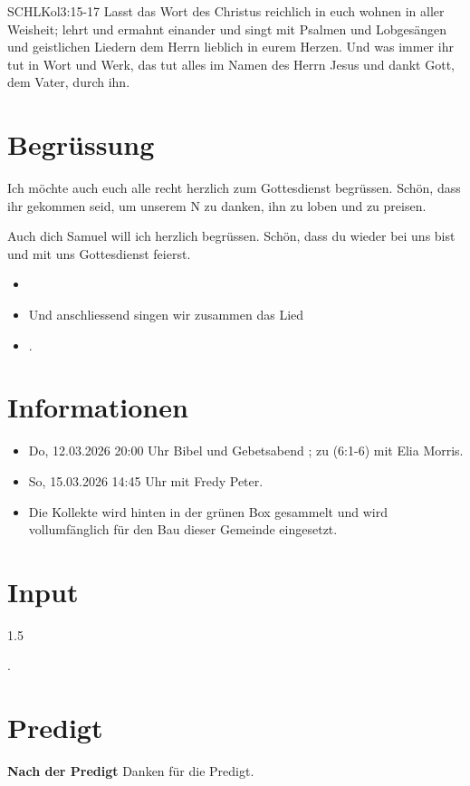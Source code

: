 \documentclass[fontsize=14pt]{mybib}
\newcommand{\Name}{Samuel}
\begin{document}
\begin{bibelbox}{SCHL}{Kol}{3:15-17}
    Lasst das Wort des Christus reichlich in euch wohnen in aller Weisheit; lehrt und ermahnt einander und singt mit Psalmen und Lobgesängen und geistlichen Liedern dem Herrn lieblich in eurem Herzen. Und was immer ihr tut in Wort und Werk, das tut alles im Namen des Herrn Jesus und dankt Gott, dem Vater, durch ihn.
\end{bibelbox}
\section{Begrüssung}
Ich möchte auch euch alle recht herzlich zum Gottesdienst begrüssen. Schön, dass ihr gekommen seid, um unserem \herr N zu danken, ihn zu loben und zu preisen.

Auch dich \Name{} will ich herzlich begrüssen. Schön, dass du wieder bei uns bist und mit uns Gottesdienst feierst.
\begin{itemize}
    \item[] \beten{}
    \item[] Und anschliessend singen wir zusammen das Lied
    \item[] .
\end{itemize}

\section{Informationen}
\begin{itemize}
    \item {} Do, 12.03.2026 20:00 Uhr Bibel und Gebetsabend ; zu (6:1-6) mit Elia Morris.
    \item {} So, 15.03.2026 14:45 Uhr mit Fredy Peter.
    \item {} Die Kollekte wird hinten in der grünen Box gesammelt und wird vollumfänglich für den Bau dieser Gemeinde eingesetzt.
\end{itemize}

\section{ Input }
\begin{spacing}{1.5}
    
    .
\end{spacing}
\section{Predigt}
\textbf{Nach der Predigt}\newline
Danken für die Predigt.
\end{document}
